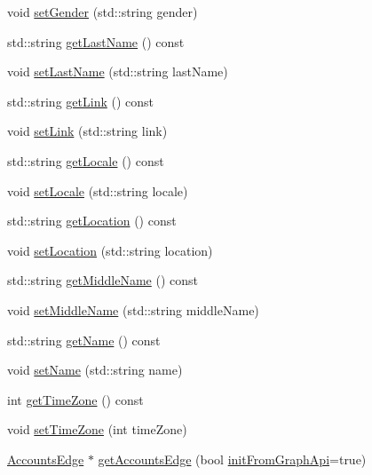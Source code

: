 \begin{DoxyCompactItemize}
void \hyperlink{classfl4cpp_1_1_user_node_a22aaf453ca67c9819b7a5cca498c9cc2}{set\+Gender} (std\+::string gender)
\item 
std\+::string \hyperlink{classfl4cpp_1_1_user_node_ae0410736c3f7eae9be4d374e0f021d5d}{get\+Last\+Name} () const 
\item 
void \hyperlink{classfl4cpp_1_1_user_node_a83118124e7c38ef4ddc15ad7fa84fb25}{set\+Last\+Name} (std\+::string last\+Name)
\item 
std\+::string \hyperlink{classfl4cpp_1_1_user_node_ab53a2316d3f552a89e880d80478cd14f}{get\+Link} () const 
\item 
void \hyperlink{classfl4cpp_1_1_user_node_aa777367af7fddbe4d4ec2bee1dae0103}{set\+Link} (std\+::string link)
\item 
std\+::string \hyperlink{classfl4cpp_1_1_user_node_acc2c4f7aeed8ee9ca178853e9bd929fe}{get\+Locale} () const 
\item 
void \hyperlink{classfl4cpp_1_1_user_node_a488bbf1d8c05bf5c72534586cba13f93}{set\+Locale} (std\+::string locale)
\item 
std\+::string \hyperlink{classfl4cpp_1_1_user_node_a6e152c4b4cc589fa596f87380745877b}{get\+Location} () const 
\item 
void \hyperlink{classfl4cpp_1_1_user_node_a021f312184774663bc8f89f11aba5701}{set\+Location} (std\+::string location)
\item 
std\+::string \hyperlink{classfl4cpp_1_1_user_node_a6110eda566bd20788ae1bb08fdc344cf}{get\+Middle\+Name} () const 
\item 
void \hyperlink{classfl4cpp_1_1_user_node_adbd826e4009cd741fba2919d5c78874b}{set\+Middle\+Name} (std\+::string middle\+Name)
\item 
std\+::string \hyperlink{classfl4cpp_1_1_user_node_a7020c60b140ff896dfff7c336cca8910}{get\+Name} () const 
\item 
void \hyperlink{classfl4cpp_1_1_user_node_a43cc775fcbb0bb42122dbd4412f9fbfc}{set\+Name} (std\+::string name)
\item 
int \hyperlink{classfl4cpp_1_1_user_node_a7431c59eb661d4b4cc2a306b96ce77e4}{get\+Time\+Zone} () const 
\item 
void \hyperlink{classfl4cpp_1_1_user_node_a20d6e51af4340da57f491f4f8b582c17}{set\+Time\+Zone} (int time\+Zone)
\item 
\hyperlink{classfl4cpp_1_1_accounts_edge}{Accounts\+Edge} $\ast$ \hyperlink{classfl4cpp_1_1_user_node_afb41213192d06dbdf4a25ee35d75b064}{get\+Accounts\+Edge} (bool \hyperlink{classfl4cpp_1_1_node_a1dd4594ffd7eb08e9e8c5031d2109a59}{init\+From\+Graph\+Api}=true)

\end{DoxyCompactItemize}
